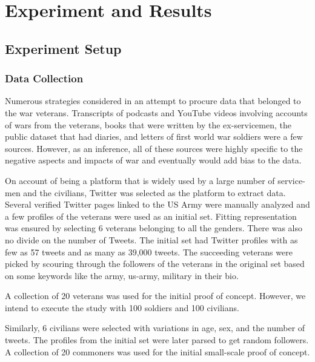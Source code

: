 \section{Experiment and Results}

\subsection{Experiment Setup}

\subsubsection{Data Collection}


Numerous strategies considered in an attempt to procure data that belonged to
the war veterans. Transcripts of podcasts and YouTube videos involving accounts
of wars from the veterans, books that were written by the ex-servicemen, the
public dataset that had diaries, and letters of first world war soldiers were a
few sources. However, as an inference, all of these sources were highly specific
to the negative aspects and impacts of war and eventually would add bias to the
data.

On account of being a platform that is widely used by a large number of
service-men and the civilians, Twitter was selected as the platform to extract
data. Several verified Twitter pages linked to the US Army were manually analyzed
and a few profiles of the veterans were used as an initial set. Fitting
representation was ensured by selecting 6 veterans belonging to all the genders.
There was also no divide on the number of Tweets. The initial set had Twitter
profiles with as few as 57 tweets and as many as 39,000 tweets. The succeeding
veterans were picked by scouring through the followers of the veterans in the
original set based on some keywords like the army, us-army, military in their
bio.

A collection of 20 veterans was used for the initial proof of concept. However,
we intend to execute the study with 100 soldiers and 100 civilians.

Similarly, 6 civilians were selected with variations in age, sex, and the number
of tweets. The profiles from the initial set were later parsed to get random
followers. A collection of 20 commoners was used for the initial small-scale
proof of concept.

